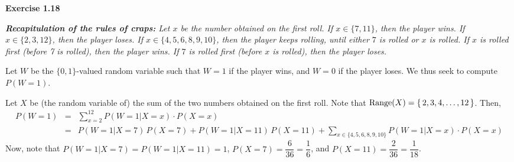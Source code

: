 
\noindent
\textbf{Exercise 1.18}

\vskip 0.5cm
\noindent
\textit{\textbf{Recapitulation of the rules of craps:}
Let $x$ be the number obtained on the first roll.
If $x \in \{7, 11\}$, then the player wins.
If $x \in \{ 2,3,12\}$, then the player loses.
If $x \in \{4,5,6,8,9,10\}$, then the player keeps rolling,
until either $7$ is rolled or $x$ is rolled.
If $x$ is rolled first (before 7 is rolled), then the player wins.
If $7$ is rolled first (before $x$ is rolled), then the player loses.
}

\vskip 0.5cm
\noindent
Let $W$ be the $\{0,1\}$-valued random variable such that $W = 1$ if the player wins,
and $W = 0$ if the player loses.  We thus seek to compute $P(W = 1)$.

Let $X$ be (the random variable of) the sum of the two numbers obtained on the first roll.
Note that $\textnormal{Range}(X) = \{\,2,3,4,\ldots,12\,\}$.
Then,
\begin{eqnarray*}
P(W = 1)
& = &
\sum^{12}_{x=2}P(W=1 \vert X = x)\cdot P(X = x) \\
& = &
P(W=1 \vert X = 7)\,P(X = 7) + P(W=1 \vert X = 11)\,P(X = 11) + 
\sum_{x \in \{4,5,6,8,9,10\}}P(W=1 \vert X = x)\cdot P(X = x)
\end{eqnarray*}
Now, note that $P(W = 1 \vert X = 7) = P(W = 1 \vert X = 11) = 1$,
$P(X = 7) = \dfrac{6}{36} = \dfrac{1}{6}$, and
$P(X = 11) = \dfrac{2}{36} = \dfrac{1}{18}$.

